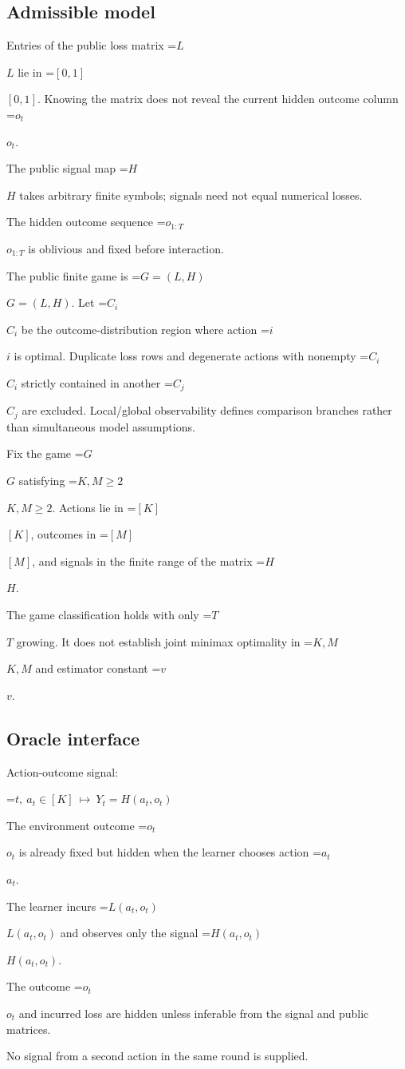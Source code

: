 \documentclass[10pt,a4paper]{article}
\newcommand{\AtlasMath}[1]{\par\begingroup\centering\setbox0=\hbox{$\displaystyle #1$}\ifdim\wd0>1.4\linewidth\typeout{ATLAS WIDE FORMULA: \the\wd0}\fi\ifdim\wd0>\linewidth\resizebox{\linewidth}{!}{\box0}\else\box0\fi\par\endgroup}
\newcommand{\AtlasInlineMath}[1]{\begingroup\setbox0=\hbox{$#1$}\ifdim\wd0>.4\linewidth\endgroup\AtlasMath{#1}\else\endgroup$#1$\fi}
\begin{document}
\subsection{Admissible model}
Entries of the public loss matrix \AtlasInlineMath{L} lie in \AtlasInlineMath{[0,1]}. Knowing the matrix does not reveal the current hidden outcome column \AtlasInlineMath{o_t}.

The public signal map \AtlasInlineMath{H} takes arbitrary finite symbols; signals need not equal numerical losses.

The hidden outcome sequence \AtlasInlineMath{o_{1:T}} is oblivious and fixed before interaction.

The public finite game is \AtlasInlineMath{G=(L,H)}. Let \AtlasInlineMath{C_i} be the outcome-distribution region where action \AtlasInlineMath{i} is optimal. Duplicate loss rows and degenerate actions with nonempty \AtlasInlineMath{C_i} strictly contained in another \AtlasInlineMath{C_j} are excluded. Local/global observability defines comparison branches rather than simultaneous model assumptions.

Fix the game \AtlasInlineMath{G} satisfying \AtlasInlineMath{K,M\ge2}. Actions lie in \AtlasInlineMath{[K]}, outcomes in \AtlasInlineMath{[M]}, and signals in the finite range of the matrix \AtlasInlineMath{H}.

The game classification holds with only \AtlasInlineMath{T} growing. It does not establish joint minimax optimality in \AtlasInlineMath{K,M} and estimator constant \AtlasInlineMath{v}.

\subsection{Oracle interface}
Action-outcome signal:


\AtlasMath{t,\ a_t\in[K]\ \longmapsto\ Y_t=H(a_t,o_t)}


The environment outcome \AtlasInlineMath{o_t} is already fixed but hidden when the learner chooses action \AtlasInlineMath{a_t}.

The learner incurs \AtlasInlineMath{L(a_t,o_t)} and observes only the signal \AtlasInlineMath{H(a_t,o_t)}.

The outcome \AtlasInlineMath{o_t} and incurred loss are hidden unless inferable from the signal and public matrices.

No signal from a second action in the same round is supplied.
\end{document}
